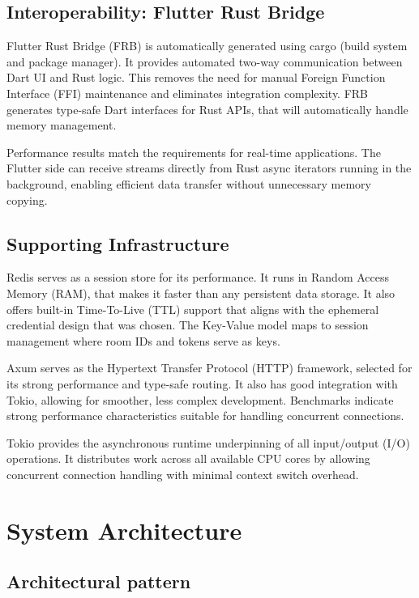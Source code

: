 \documentclass[12pt,a4paper]{article}
\begin{document}
\subsection{Interoperability: Flutter Rust Bridge}

Flutter Rust Bridge (FRB) \cite{fzy25} is automatically generated using cargo (build system and package manager). It provides automated two-way communication between Dart UI and Rust logic. This removes the need for manual Foreign Function Interface (FFI) \cite{Rust_FFI} maintenance and eliminates integration complexity. FRB generates type-safe Dart interfaces for Rust APIs, that will automatically handle memory management.

Performance results match the requirements for real-time applications. The Flutter side can receive streams directly from Rust async iterators running in the background, enabling efficient data transfer without unnecessary memory copying.

\subsection{Supporting Infrastructure}

Redis \cite{Redis} serves as a session store for its performance. It runs in Random Access Memory (RAM), that makes it faster than any persistent data storage. It also offers built-in Time-To-Live (TTL) support that aligns with the ephemeral credential design that was chosen. The Key-Value model maps to session management where room IDs and tokens serve as keys.

Axum \cite{Leap25a} serves as the Hypertext Transfer Protocol (HTTP) framework, selected for its strong performance and type-safe routing. It also has good integration with Tokio, allowing for smoother, less complex development. Benchmarks indicate strong performance characteristics suitable for handling concurrent connections.

Tokio provides the asynchronous runtime underpinning of all input/output (I/O) operations. It distributes work across all available CPU cores by allowing concurrent connection handling with minimal context switch overhead.

\section{System Architecture}

\subsection{Architectural pattern}
\end{document}
